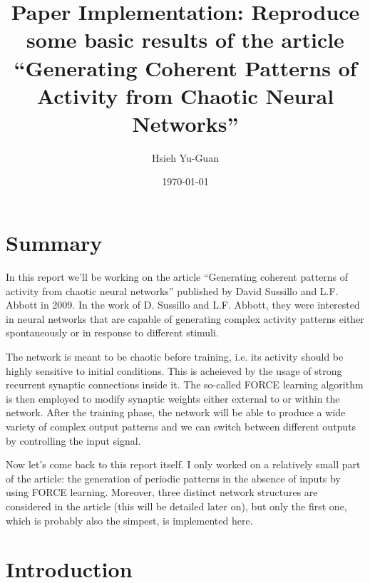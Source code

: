 

\pagestyle{fancy} 
\rhead{}
\rfoot{\thepage}
\cfoot{}
\lfoot{~\theauthor}
\renewcommand{\headrulewidth}{0.4pt}
\renewcommand{\footrulewidth}{0.4pt}


\title{Paper Implementation: Reproduce some basic results
of the article ``Generating Coherent Patterns of Activity from
Chaotic Neural Networks''\vspace{-0.5em}}
\author{Hsieh Yu-Guan}
\date{\today}
\maketitle

\thispagestyle{fancy}

\setcounter{secnumdepth}{0}


\section{Summary}

In this report we'll be working on the article ``Generating coherent
patterns of activity from chaotic neural networks'' published by 
David Sussillo and L.F. Abbott in 2009. In the work of D. Sussillo and L.F.
Abbott, they were interested in neural networks that are capable of
generating complex activity patterns either spontaneously or in response to
different stimuli.

The network is meant to be chaotic before training, i.e.
its activity should be highly sensitive to initial conditions. This is
acheieved by the usage of strong recurrent synaptic connections inside it. 
The so-called FORCE learning algorithm is then employed to modify
synaptic weights either external to or within the network. 
After the training phase, the network will be able to produce a wide 
variety of complex output patterns and we can switch between different
outputs by controlling the input signal.

Now let's come back to this report itself. I only worked on a relatively 
small part of the article: the generation of periodic patterns in the 
absence of inputs by using FORCE learning. Moreover, three distinct network
structures are considered in the article (this will be detailed later on), 
but only the first one, which is probably also the simpest, is implemented 
here.


\section{Introduction}

